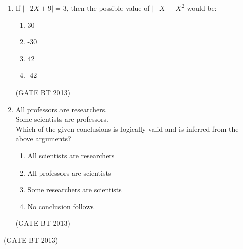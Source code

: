 \documentclass[journal,12pt,onecolumn]{IEEEtran}
\theoremstyle{remark}
\begin{document}
\begin{enumerate}
\item 

If \(\left| -2X + 9 \right| = 3\), then the possible value of \(\left| -X \right| - X^2\) would be:

\begin{enumerate}[label=(\Alph*)]
    \item 30
    \item -30
    \item 42
    \item -42
\end{enumerate} \hfill(GATE BT 2013)

\item 

All professors are researchers. \\
Some scientists are professors. \\

Which of the given conclusions is logically valid and is inferred from the above arguments?

\begin{enumerate}[label=(\Alph*)]
    \item All scientists are researchers
    \item All professors are scientists
    \item Some researchers are scientists
    \item No conclusion follows
\end{enumerate} \hfill(GATE BT 2013)
\end{enumerate} \hfill(GATE BT 2013)
\end{document}
